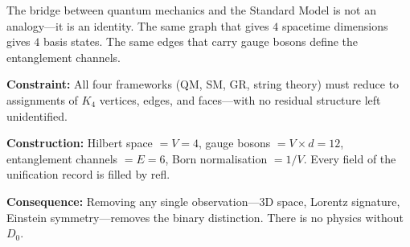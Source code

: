 \documentclass[11pt,a4paper]{book}
\def\texttt#1{#1}%
\begin{document}
The bridge between quantum mechanics and the Standard Model is not an analogy---it is an identity. The same graph that gives $4$ spacetime dimensions gives $4$ basis states. The same edges that carry gauge bosons define the entanglement channels.

\textbf{Constraint:} All four frameworks (QM, SM, GR, string theory) must reduce to assignments of $K_4$ vertices, edges, and faces---with no residual structure left unidentified.

\textbf{Construction:} Hilbert space $= V = 4$, gauge bosons $= V \times d = 12$, entanglement channels $= E = 6$, Born normalisation $= 1/V$. Every field of the unification record is filled by \texttt{refl}.

\textbf{Consequence:} Removing any single observation---3D space, Lorentz signature, Einstein symmetry---removes the binary distinction. There is no physics without $D_0$.
\end{document}
